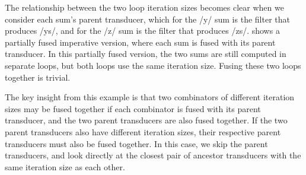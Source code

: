 The relationship between the two loop iteration sizes becomes clear when we consider each sum's parent transducer, which for the \Hs/y/ sum is the filter that produces \Hs/ys/, and for the \Hs/z/ sum is the filter that produces \Hs/zs/.
 shows a partially fused imperative version, where each sum is fused with its parent transducer.
In this partially fused version, the two sums are still computed in separate loops, but both loops use the same iteration size.
Fusing these two loops together is trivial.

The key insight from this example is that two combinators of different iteration sizes may be fused together if each combinator is fused with its parent transducer, and the two parent transducers are also fused together.
If the two parent transducers also have different iteration sizes, their respective parent transducers must also be fused together.
In this case, we skip the parent transducers, and look directly at the closest pair of ancestor transducers with the same iteration size as each other.


